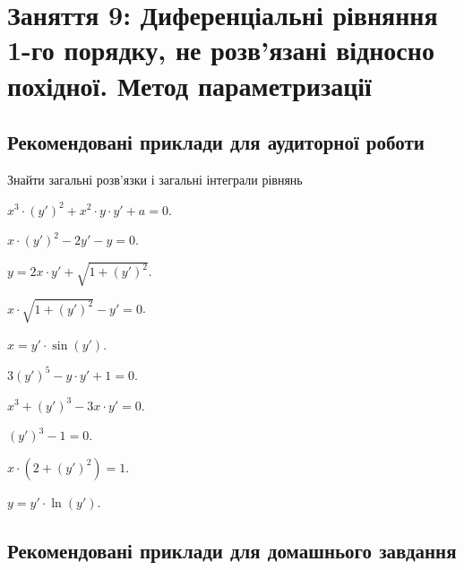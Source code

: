 \section*{Заняття 9: Диференціальні рівняння 1-го порядку, не розв'язані відносно похідної. Метод параметризації}

\subsection*{Рекомендовані приклади для аудиторної роботи}

Знайти загальні розв'язки і загальні інтеграли рівнянь

\begin{problem}
	$x^3 \cdot (y')^2 + x^2 \cdot y \cdot y' + a = 0$.
\end{problem}

\begin{problem}
	$x \cdot (y')^2 - 2 y' - y = 0$.
\end{problem}

\begin{problem}
	$y = 2 x \cdot y' + \sqrt{1 + (y')^2}$.
\end{problem}

\begin{problem}
	$x \cdot \sqrt{1 + (y')^2} - y' = 0$.
\end{problem}

\begin{problem}
	$x = y' \cdot \sin (y')$.
\end{problem}

\begin{problem}
	$3 (y')^5 - y \cdot y' + 1 = 0$.
\end{problem}

\begin{problem}
	$x^3 + (y')^3 - 3 x \cdot y' = 0$.
\end{problem}

\begin{problem}
	$(y')^3 - 1 = 0$.
\end{problem}

\begin{problem}
	$x \cdot (2 + (y')^2) = 1$.
\end{problem}

\begin{problem}
	$y = y' \cdot \ln (y')$.
\end{problem}

\subsection*{Рекомендовані приклади для домашнього завдання}

